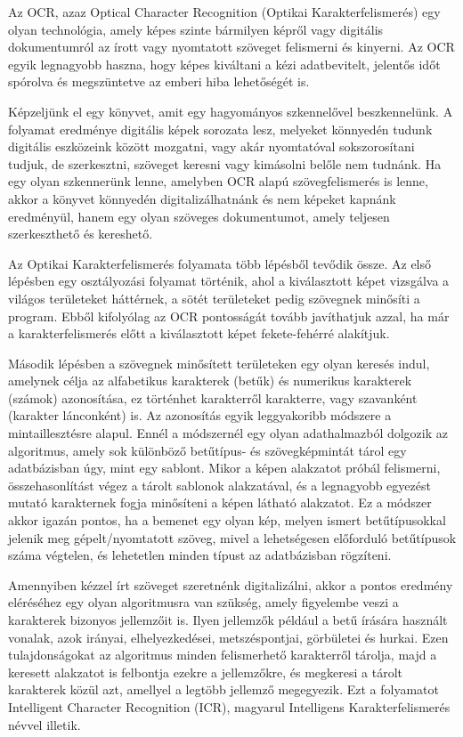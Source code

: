 \documentclass[12pt]{report}
\begin{document}
Az OCR, azaz Optical Character Recognition \cite{ocr} (Optikai Karakterfelismerés) egy olyan technológia, amely képes szinte bármilyen képről vagy digitális dokumentumról az írott vagy nyomtatott szöveget felismerni és kinyerni. Az OCR egyik legnagyobb haszna, hogy képes kiváltani a kézi adatbevitelt, jelentős időt spórolva és megszüntetve az emberi hiba lehetőségét is.

\newline
Képzeljünk el egy könyvet, amit egy hagyományos szkennelővel beszkennelünk. A folyamat eredménye digitális képek sorozata lesz, melyeket könnyedén tudunk digitális eszközeink között mozgatni, vagy akár nyomtatóval sokszorosítani tudjuk, de szerkesztni, szöveget keresni vagy kimásolni belőle nem tudnánk. Ha egy olyan szkennerünk lenne, amelyben OCR alapú szövegfelismerés is lenne, akkor a könyvet könnyedén digitalizálhatnánk és nem képeket kapnánk eredményül, hanem egy olyan szöveges dokumentumot, amely teljesen szerkeszthető és kereshető.

\newline
Az Optikai Karakterfelismerés folyamata több lépésből tevődik össze. \cite{ocr_aws}
Az első lépésben egy osztályozási folyamat történik, ahol a kiválasztott képet vizsgálva a világos területeket háttérnek, a sötét területeket pedig szövegnek minősíti a program. Ebből kifolyólag az OCR pontosságát tovább javíthatjuk azzal, ha már a karakterfelismerés előtt a kiválasztott képet fekete-fehérré alakítjuk.

Második lépésben a szövegnek minősített területeken egy olyan keresés indul, amelynek célja az alfabetikus karakterek (betűk) és numerikus karakterek (számok) azonosítása, ez történhet karakterről karakterre, vagy szavanként (karakter lánconként) is. Az azonosítás egyik leggyakoribb módszere a mintaillesztésre alapul. Ennél a módszernél egy olyan adathalmazból dolgozik az algoritmus, amely sok különböző betűtípus- és szövegképmintát tárol egy adatbázisban úgy, mint egy sablont. Mikor a képen alakzatot próbál felismerni, összehasonlítást végez a tárolt sablonok alakzatával, és a legnagyobb egyezést mutató karakternek fogja minősíteni a képen látható alakzatot. Ez a módszer akkor igazán pontos, ha a bemenet egy olyan kép, melyen ismert betűtípusokkal jelenik meg gépelt/nyomtatott szöveg, mivel a lehetségesen előforduló betűtípusok száma végtelen, és lehetetlen minden típust az adatbázisban rögzíteni.

Amennyiben kézzel írt szöveget szeretnénk digitalizálni, akkor a pontos eredmény eléréséhez egy olyan algoritmusra van szükség, amely figyelembe veszi a karakterek bizonyos jellemzőit is. Ilyen jellemzők például a betű írására használt vonalak, azok irányai, elhelyezkedései, metszéspontjai, görbületei és hurkai. Ezen tulajdonságokat az algoritmus minden felismerhető karakterről tárolja, majd a keresett alakzatot is felbontja ezekre a jellemzőkre, és megkeresi a tárolt karakterek közül azt, amellyel a legtöbb jellemző megegyezik. Ezt a folyamatot Intelligent Character Recognition (ICR), magyarul Intelligens Karakterfelismerés névvel illetik. \cite{handwritten_ocr}
\end{document}
